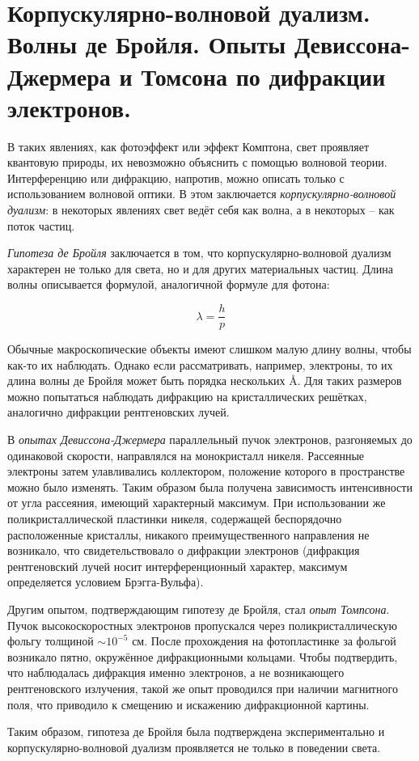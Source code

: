 \section{Корпускулярно-волновой дуализм. Волны де Бройля. Опыты Девиссона-Джермера и Томсона по
дифракции электронов.}

В таких явлениях, как фотоэффект или эффект Комптона, свет проявляет квантовую природы, их невозможно объяснить с помощью волновой теории. Интерференцию или дифракцию, напротив, можно описать только с использованием волновой оптики. В этом заключается \textit{корпускулярно-волновой дуализм}: в некоторых явлениях свет ведёт себя как волна, а в некоторых -- как поток частиц.

\textit{Гипотеза де Бройля} заключается в том, что корпускулярно-волновой дуализм характерен не только для света, но и для других материальных частиц. Длина волны описывается формулой, аналогичной формуле для фотона:

\begin{equation}
    \lambda = \frac{h}{p}
\end{equation}

Обычные макроскопические объекты имеют слишком малую длину волны, чтобы как-то их наблюдать. Однако если рассматривать, например, электроны, то их длина волны де Бройля может быть порядка нескольких \AA. Для таких размеров можно попытаться наблюдать дифракцию на кристаллических решётках, аналогично дифракции рентгеновских лучей.

В \textit{опытах Девиссона-Джермера} параллельный пучок электронов, разгоняемых до одинаковой скорости, направлялся на монокристалл никеля. Рассеянные электроны затем улавливались коллектором, положение которого в пространстве можно было изменять. Таким образом была получена зависимость интенсивности от угла рассеяния, имеющий характерный максимум. При использовании же поликристаллической пластинки никеля, содержащей беспорядочно расположенные кристаллы, никакого преимущественного направления не возникало, что свидетельствовало о дифракции электронов (дифракция рентгеновский лучей носит интерференционный характер, максимум определяется условием Брэгга-Вульфа).

Другим опытом, подтверждающим гипотезу де Бройля, стал \textit{опыт Томпсона}. Пучок высокоскоростных электронов пропускался через поликристаллическую фольгу толщиной $\sim 10^{-5}$ см. После прохождения на фотопластинке за фольгой возникало пятно, окружённое дифракционными кольцами. Чтобы подтвердить, что наблюдалась дифракция именно электронов, а не возникающего рентгеновского излучения, такой же опыт проводился при наличии магнитного поля, что приводило к смещению и искажению дифракционной картины.

Таким образом, гипотеза де Бройля была подтверждена экспериментально и корпускулярно-волновой дуализм проявляется не только в поведении света.